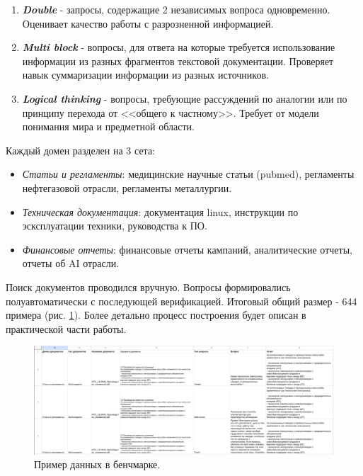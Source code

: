 \begin{enumerate}
    \item \textbf{\textit{Double}} - запросы, содержащие 2 независимых вопроса одновременно. Оценивает качество работы с разрозненной информацией.

    \item \textbf{\textit{Multi block}} - вопросы, для ответа на которые требуется использование информации из разных фрагментов текстовой документации. Проверяет навык суммаризации информации из разных источников.

    \item \textbf{\textit{Logical thinking}} - вопросы, требующие рассуждений по аналогии или по принципу перехода от <<общего к частному>>. Требует от модели понимания мира и предметной области. 
    
\end{enumerate}

Каждый домен разделен на 3 сета:

\begin{itemize}

    \item \textit{Статьи и регламенты}: медицинские научные статьи (pubmed), регламенты нефтегазовой отрасли, регламенты металлургии.
    
    \item \textit{Техническая документация}: документация linux, инструкции по эсксплуатации техники, руководства к ПО.
    
    \item \textit{Финансовые отчеты}: финансовые отчеты кампаний, аналитические отчеты, отчеты об AI отрасли.
    
\end{itemize}


Поиск документов проводился вручную. Вопросы формировались полуавтоматически с последующей верификацией. Итоговый общий размер - 644 примера (рис. \ref{Benchmark example}). Более детально процесс построения будет описан в практической части работы.

\begin{figure}[ht!]
    \centering
    \includegraphics[scale=0.25]{images/Benchmark_data_example.png}
    \caption{Пример данных в бенчмарке.}
    \label{Benchmark example}
\end{figure}

\newpage